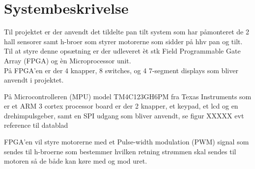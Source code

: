\section{Systembeskrivelse}
Til projektet er der anvendt det tildelte pan tilt system som har påmonteret de 2 hall sensorer samt h-broer som styrer motorerne som sidder på hhv pan og tilt.\\
Til at styre denne opsætning er der udleveret èt stk Field Programmable Gate Array (FPGA) og èn Microprocessor unit.
\\
På FPGA'en \cite{Nexys2Datasheet} er der 4 knapper, 8 switches, og 4 7-segment displays som bliver anvendt i projektet.

På Microcontrolleren (MPU) model TM4C123GH6PM fra Texas Instruments som er et ARM 3 cortex processor board \cite{TM4C123GH6PMDatasheet} er der 2 knapper, et keypad, et lcd og en drehimpulsgeber, samt en SPI udgang som bliver anvendt, se figur XXXXX evt reference til datablad

FPGA'en vil styre motorerne med et Pulse-width modulation (PWM) signal som sendes til h-broerne som bestemmer hvilken retning strømmen skal sendes til motoren så de både kan køre med og mod uret.


